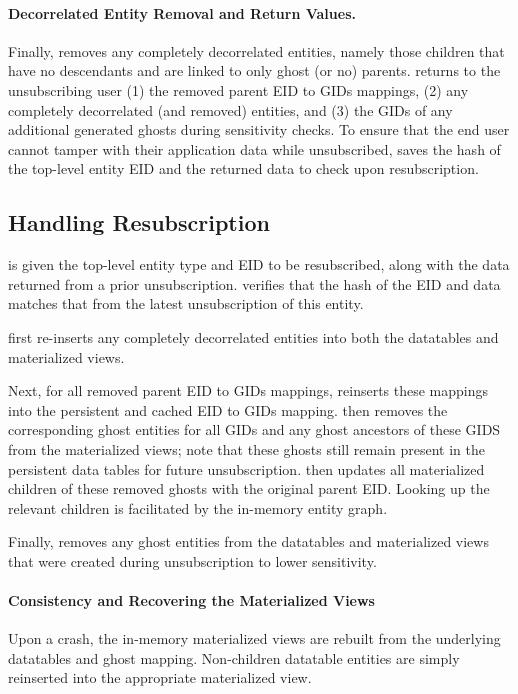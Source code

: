 \paragraph{Decorrelated Entity Removal and Return Values.}
Finally, \sys{} removes any completely decorrelated entities, namely those children that have no
descendants and are linked to only ghost (or no) parents.
\sys{} returns to the unsubscribing user (1) the removed parent EID to GIDs mappings, (2) any completely decorrelated (and removed) entities,
and (3) the GIDs of any additional generated ghosts during sensitivity checks.
To ensure that the end user cannot tamper with their application data while unsubscribed, \sys{}
saves the hash of the top-level entity EID and the returned data to check upon resubscription.

\subsection{Handling Resubscription}
\sys{} is given the top-level entity type and EID to be resubscribed, along with the data returned
from a prior unsubscription.
\sys{} verifies that the hash of the EID and data matches that from the latest unsubscription of
this entity.

\sys{} first re-inserts any completely
decorrelated entities into both the datatables and materialized views. 

Next, for all removed parent EID to GIDs mappings, \sys{} reinserts these mappings into the
persistent and cached EID to GIDs mapping.
\sys{} then removes the corresponding ghost entities for all GIDs and any ghost ancestors of these
GIDS from the materialized views; note that these ghosts still remain present in the
persistent data tables for future unsubscription.
\sys{} then updates all materialized children of these removed ghosts with the original parent EID. Looking up the relevant
children is facilitated by the in-memory entity graph. 

Finally, \sys{} removes any
ghost entities from the datatables and materialized views that were created during unsubscription to
lower sensitivity.

\paragraph{Consistency and Recovering the Materialized Views}
Upon a crash, the in-memory materialized views are rebuilt from the underlying datatables and ghost
mapping. Non-children datatable entities are simply reinserted into the appropriate
materialized view. 

